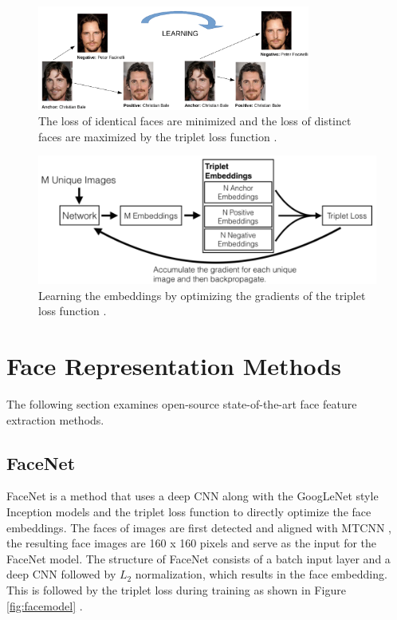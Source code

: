 \documentclass[12pt,english]{article}
\begin{document}
\begin{figure}[!tbp]
 \centering
    \includegraphics[width=0.8\textwidth]{figures/triplet_loss_example.png}
    \caption{The loss of identical faces are minimized and the loss of distinct faces are maximized by the triplet loss function \cite{pic1} \cite{pic2}.}
	\label{fig:bale}
\end{figure}

\begin{figure}[!tbp]
 \centering
    \includegraphics[width=0.7\columnwidth]{figures/openface_architecture.png}
    \caption{Learning the embeddings by optimizing the gradients of the triplet loss function \cite{amos}.}
	\label{fig:loss}
\end{figure}
 
\section{Face Representation Methods}

The following section examines open-source state-of-the-art face feature extraction methods.

\subsection{FaceNet}

\quad

FaceNet is a method that uses a deep CNN along with the GoogLeNet style Inception models and the triplet loss function to directly optimize the face embeddings. The faces of images are first detected and aligned with MTCNN \cite{sandberg}, the resulting face images are 160 x 160 pixels and serve as the input for the FaceNet model. The structure of FaceNet consists of a batch input layer and a deep CNN followed by $L_{2}$ normalization, which results in the face embedding. This is followed by the triplet loss during training as shown in Figure \ref{fig:facemodel} \cite{schroff}.
\end{document}
